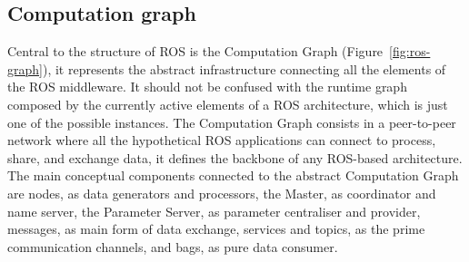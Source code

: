 \subsection{Computation graph}
Central to the structure of ROS is the Computation Graph (Figure~\ref{fig:ros-graph}), it represents the abstract infrastructure connecting all the elements of the ROS middleware. It should not be confused with the runtime graph composed by the currently active elements of a ROS architecture, which is just one of the possible instances.  The Computation Graph consists in a peer-to-peer network where all the hypothetical ROS applications can connect to process, share, and exchange data, it defines the backbone of any ROS-based architecture. The main conceptual components connected to the abstract Computation Graph are nodes, as data generators and processors, the Master, as coordinator and name server, the Parameter Server, as parameter centraliser and provider, messages, as main form of data exchange, services and topics, as the prime communication channels, and bags, as pure data consumer.

